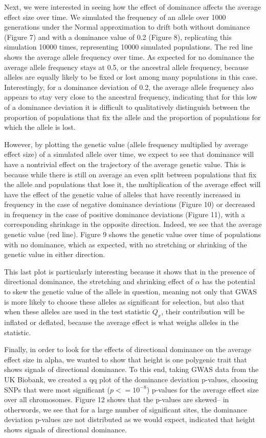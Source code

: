 \documentclass[a4paper,12pt]{article}
\begin{document}
Next, we were interested in seeing how the effect of dominance affects
the average effect size over time. We simulated the frequency of an
allele over 1000 generations under the Normal approximation to drift
both without dominance (Figure 7) and with a dominance value of 0.2
(Figure 8), replicating this simulation 10000 times, representing 10000
simulated populations. The red line shows the average allele frequency
over time. As expected for no dominance the average allele frequency
stays at 0.5, or the ancestral allele frequency, because alleles
are equally likely to be fixed or lost among many populations in this
case. Interestingly, for a dominance deviation of 0.2, the average allele
frequency also appears to stay very close to the ancestral frequency,
indicating that for this low of a dominance deviation it is difficult
to qualitatively distinguish between the proportion of populations
that fix the allele and the proportion of populations for which the
allele is lost.

However, by plotting the genetic value (allele frequency multiplied by
average effect size) of a simulated allele over time, we expect to see
that dominance will have a nontrivial effect on the trajectory of the
average genetic value. This is because while there is still on average
an even split between populations that fix the allele and populations
that lose it, the multiplication of the average effect will have the
effect of  the genetic value of alleles that have
recently increased in frequency in the case of negative dominance
deviations (Figure 10) or decreased in frequency in the case of
positive dominance deviations (Figure 11), with a corresponding
shrinkage in the opposite direction. Indeed, we see that the
average genetic value (red line). Figure 9 shows the genetic value
over time of populations with no dominance, which as expected, with no
stretching or shrinking of the genetic value in either direction.

This last plot is particularly interesting because it shows that in
the presence of directional dominance, the stretching and shrinking
effect of $\alpha$ has the potential to skew the genetic value of the
allele in question, meaning not only that GWAS is more likely to
choose these alleles as significant for selection, but also that when
these alleles are used in the test statistic $Q_x$, their contribution
will be inflated or deflated, because the average effect is what
weighs alleles in the statistic.

Finally, in order to look for the effects of directional dominance on
the average effect size in alpha, we wanted to show that height is one
polygenic trait that shows signals of directional dominance. To this
end, taking GWAS data from the UK Biobank, we created a qq plot of the
dominance deviation p-values, choosing SNPs that were 
most significant ($p <= 10^{-8}$) p-values for the average effect size
over all chromosomes. Figure 12 shows that the p-values are skewed--
in otherwords, we see that for a large number of significant sites,
the dominance deviation p-values are not distributed as we would
expect, indicated that height shows signals of directional dominance.
\end{document}
